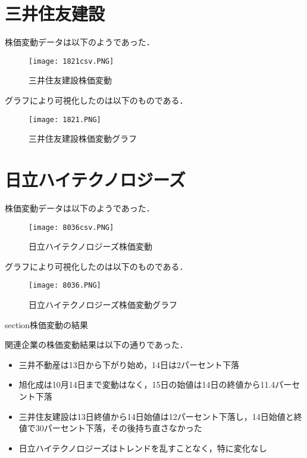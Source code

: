 {\section{三井住友建設}

株価変動データは以下のようであった．


\begin{figure}[H]
\centering
\texttt{[image: 1821csv.PNG]}
\caption{三井住友建設株価変動}\label{サンプル図}
\end{figure}


グラフにより可視化したのは以下のものである．




\begin{figure}[H]
\centering
\texttt{[image: 1821.PNG]}
\caption{三井住友建設株価変動グラフ}\label{サンプル図}
\end{figure}




\section{日立ハイテクノロジーズ}

株価変動データは以下のようであった．


\begin{figure}[H]
\centering
\texttt{[image: 8036csv.PNG]}
\caption{日立ハイテクノロジーズ株価変動}\label{サンプル図}
\end{figure}


グラフにより可視化したのは以下のものである．




\begin{figure}[H]
\centering
\texttt{[image: 8036.PNG]}
\caption{日立ハイテクノロジーズ株価変動グラフ}\label{サンプル図}
\end{figure}


section{株価変動の結果}

関連企業の株価変動結果は以下の通りであった．
\begin{itemize}
  \item 三井不動産は13日から下がり始め，14日は2パーセント下落
  \item 旭化成は10月14日まで変動はなく，15日の始値は14日の終値から11.4パーセント下落
  \item 三井住友建設は13日終値から14日始値は12パーセント下落し，14日始値と終値で30パーセント下落，その後持ち直さなかった
  \item 日立ハイテクノロジーズはトレンドを乱すことなく，特に変化なし
\end{itemize}

}

